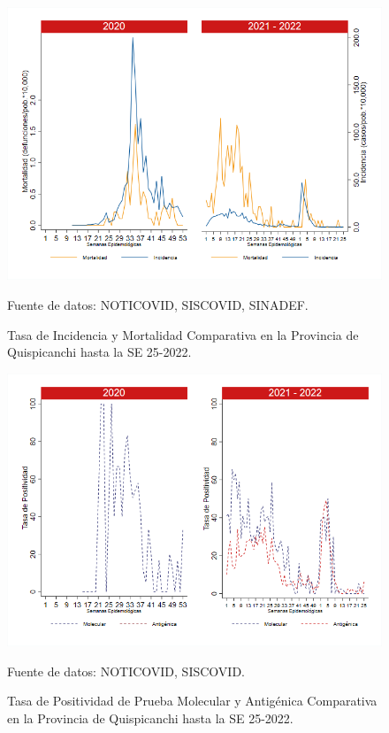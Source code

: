 \documentclass[12pt,a4paper,openany]{book}
\begin{document}
	\begin{figure}[h]
		\caption{Tasa de Incidencia y Mortalidad Comparativa en la Provincia de Quispicanchi hasta la SE 25-2022.}\label{fig:inc_mort_quisp}
		\begin{center}
			\includegraphics[width=0.85\linewidth]{../figuras/incidencia_mortalidad_20_21_12.png}
		\end{center}
		{\footnotesize {Fuente de datos: NOTICOVID, SISCOVID, SINADEF.}}
	\end{figure}
	
	\begin{figure}[h]
		\caption{Tasa de Positividad de Prueba Molecular y Antigénica Comparativa en la Provincia de Quispicanchi hasta la SE 25-2022.}\label{fig:positividad_quisp}
		\begin{center}
			\includegraphics[width=0.7\linewidth]{../figuras/positividad_20_21_12.png}
		\end{center}
		{\footnotesize {Fuente de datos: NOTICOVID, SISCOVID.}}
	\end{figure}
	
\end{document}
